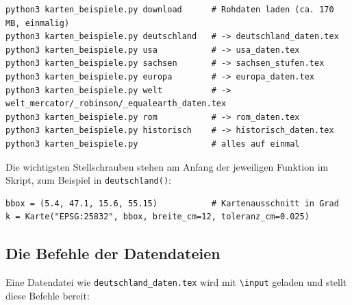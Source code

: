 \begin{lstlisting}[style=latex]
python3 karten_beispiele.py download      # Rohdaten laden (ca. 170 MB, einmalig)
python3 karten_beispiele.py deutschland   # -> deutschland_daten.tex
python3 karten_beispiele.py usa           # -> usa_daten.tex
python3 karten_beispiele.py sachsen       # -> sachsen_stufen.tex
python3 karten_beispiele.py europa        # -> europa_daten.tex
python3 karten_beispiele.py welt          # -> welt_mercator/_robinson/_equalearth_daten.tex
python3 karten_beispiele.py rom           # -> rom_daten.tex
python3 karten_beispiele.py historisch    # -> historisch_daten.tex
python3 karten_beispiele.py               # alles auf einmal
\end{lstlisting}

Die wichtigsten Stellschrauben stehen am Anfang der jeweiligen Funktion im Skript, zum Beispiel in \texttt{deutschland()}:

\begin{lstlisting}[style=latex]
bbox = (5.4, 47.1, 15.6, 55.15)           # Kartenausschnitt in Grad
k = Karte("EPSG:25832", bbox, breite_cm=12, toleranz_cm=0.025)
\end{lstlisting}


\subsection{Die Befehle der Datendateien}

Eine Datendatei wie \texttt{deutschland\_daten.tex} wird mit \texttt{\textbackslash input} geladen und stellt diese Befehle bereit:


